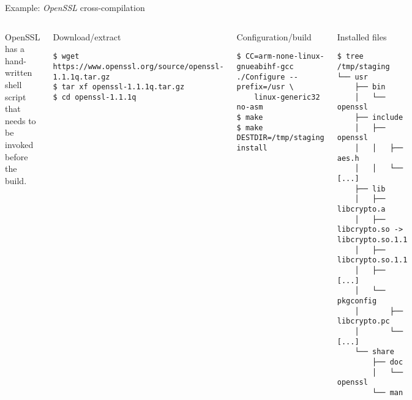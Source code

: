 \begin{frame}[fragile]{Example: {\em OpenSSL} cross-compilation}

  \begin{columns}
  OpenSSL has a hand-written  shell script that needs
  to be invoked before the build.

  \begin{block}{Download/extract}
    {\tiny
\begin{verbatim}
$ wget https://www.openssl.org/source/openssl-1.1.1q.tar.gz
$ tar xf openssl-1.1.1q.tar.gz
$ cd openssl-1.1.1q
\end{verbatim}
    }
  \end{block}

  \begin{block}{Configuration/build}
    {\tiny
\begin{verbatim}
$ CC=arm-none-linux-gnueabihf-gcc ./Configure --prefix=/usr \
    linux-generic32 no-asm
$ make
$ make DESTDIR=/tmp/staging install
\end{verbatim}
    }
  \end{block}
  \begin{block}{Installed files}
    {\tiny
\begin{verbatim}
$ tree /tmp/staging
└── usr
    ├── bin
    │   └── openssl
    ├── include
    │   ├── openssl
    │   │   ├── aes.h
    │   │   └── [...]
    ├── lib
    │   ├── libcrypto.a
    │   ├── libcrypto.so -> libcrypto.so.1.1
    │   ├── libcrypto.so.1.1
    │   ├── [...]
    │   └── pkgconfig
    │       ├── libcrypto.pc
    │       └── [...]
    └── share
        ├── doc
        │   └── openssl
        └── man
\end{verbatim}
    }
  \end{block}
\end{columns}
\end{frame}

